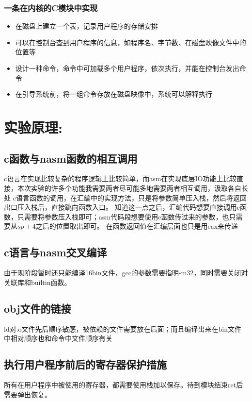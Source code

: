 \documentclass[a4paper,11pt,UTF8]{ctexart}
\begin{document}
    \subsubsection{一条在内核的C模块中实现}
      \begin{itemize}
          \item 在磁盘上建立一个表，记录用户程序的存储安排
          \item 可以在控制台查到用户程序的信息，如程序名、字节数、在磁盘映像文件中的位置等
          \item 设计一种命令，命令中可加载多个用户程序，依次执行，并能在控制台发出命令
          \item 在引导系统前，将一组命令存放在磁盘映像中，系统可以解释执行
      \end{itemize}
        

\section{实验原理:}
      \subsection{c函数与nasm函数的相互调用}
        c语言在实现比较复杂的程序逻辑上比较简单，而asm在实现底层IO功能上比较直接，本次实验的许多个功能我需要两者尽可能多地需要两者相互调用，汲取各自长处
        c语言函数的调用，在汇编中的实现方法，只是将参数简单压入栈，然后将返回出口压入栈后，直接跳向函数入口。
        知道这一点之后，汇编代码想要直接调用c函数，只需要将参数压入栈即可；asm代码段想要使用c函数传过来的参数，也只需要从$sp+4$之后的位置取出即可。
        在函数返回值在汇编层面也只是用eax来传递
      \subsection{c语言与nasm交叉编译}
        由于现阶段暂时还只能编译16bin文件，gcc的参数需要指明-m32，同时需要关闭对关联库和builtin函数。
      \subsection{obj文件的链接}
        ld对.o文件先后顺序敏感，被依赖的文件需要放在后面；而且编译出来在bin文件中相对顺序也和命令中文件顺序有关
      \subsection{执行用户程序前后的寄存器保护措施}
        所有在用户程序中被使用的寄存器，都需要使用栈加以保存。待到模块结束ret后需要弹出恢复。
\end{document}
